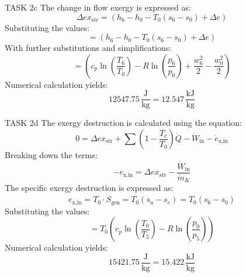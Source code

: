 TASK 2c  
The change in flow exergy is expressed as:  
\[
\Delta ex_{\text{str}} = \left( h_6 - h_0 - T_0(s_6 - s_0) + \Delta e \right)
\]  
Substituting the values:  
\[
= \left( h_6 - h_0 - T_0(s_6 - s_0) + \Delta e \right)
\]  
With further substitutions and simplifications:  
\[
= \left( c_p \ln\left(\frac{T_6}{T_0}\right) - R \ln\left(\frac{p_6}{p_0}\right) + \frac{w_6^2}{2} - \frac{w_0^2}{2} \right)
\]  
Numerical calculation yields:  
\[
12547.75 \, \frac{\text{J}}{\text{kg}} = 12.547 \, \frac{\text{kJ}}{\text{kg}}
\]  

TASK 2d  
The exergy destruction is calculated using the equation:  
\[
0 = \Delta ex_{\text{str}} + \sum \left(1 - \frac{T_c}{T_0}\right) \dot{Q} - \dot{W}_{\text{in}} - \dot{e}_{\text{x,in}}
\]  
Breaking down the terms:  
\[
-e_{\text{x,in}} = \Delta ex_{\text{str}} - \frac{\dot{W}_{\text{in}}}{\dot{m}_K}
\]  
The specific exergy destruction is expressed as:  
\[
e_{\text{x,in}} = T_0 \cdot \dot{S}_{\text{gen}} = T_0 \left(s_a - s_e\right) = T_0 \left(s_6 - s_0\right)
\]  
Substituting the values:  
\[
= T_0 \left(c_p \ln\left(\frac{T_0}{T_5}\right) - R \ln\left(\frac{p_0}{p_5}\right)\right)
\]  
Numerical calculation yields:  
\[
15421.75 \, \frac{\text{J}}{\text{kg}} = 15.422 \, \frac{\text{kJ}}{\text{kg}}
\]  